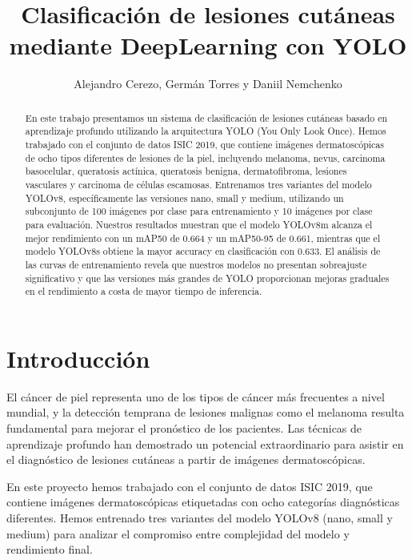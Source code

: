 \documentclass{llncs}
\begin{document}
\title{Clasificación de lesiones cutáneas mediante DeepLearning con YOLO}

\author{Alejandro Cerezo, Germán Torres y Daniil Nemchenko}

\maketitle

\begin{abstract}
En este trabajo presentamos un sistema de clasificación de lesiones cutáneas basado en aprendizaje profundo utilizando la arquitectura YOLO (You Only Look Once). Hemos trabajado con el conjunto de datos ISIC 2019, que contiene imágenes dermatoscópicas de ocho tipos diferentes de lesiones de la piel, incluyendo melanoma, nevus, carcinoma basocelular, queratosis actínica, queratosis benigna, dermatofibroma, lesiones vasculares y carcinoma de células escamosas. Entrenamos tres variantes del modelo YOLOv8, específicamente las versiones nano, small y medium, utilizando un subconjunto de 100 imágenes por clase para entrenamiento y 10 imágenes por clase para evaluación. Nuestros resultados muestran que el modelo YOLOv8m alcanza el mejor rendimiento con un mAP50 de 0.664 y un mAP50-95 de 0.661, mientras que el modelo YOLOv8s obtiene la mayor accuracy en clasificación con 0.633. El análisis de las curvas de entrenamiento revela que nuestros modelos no presentan sobreajuste significativo y que las versiones más grandes de YOLO proporcionan mejoras graduales en el rendimiento a costa de mayor tiempo de inferencia.
\end{abstract}

\section{Introducción}

El cáncer de piel representa uno de los tipos de cáncer más frecuentes a nivel mundial, y la detección temprana de lesiones malignas como el melanoma resulta fundamental para mejorar el pronóstico de los pacientes. Las técnicas de aprendizaje profundo han demostrado un potencial extraordinario para asistir en el diagnóstico de lesiones cutáneas a partir de imágenes dermatoscópicas.

En este proyecto hemos trabajado con el conjunto de datos ISIC 2019, que contiene imágenes dermatoscópicas etiquetadas con ocho categorías diagnósticas diferentes. Hemos entrenado tres variantes del modelo YOLOv8 (nano, small y medium) para analizar el compromiso entre complejidad del modelo y rendimiento final.
\end{document}

